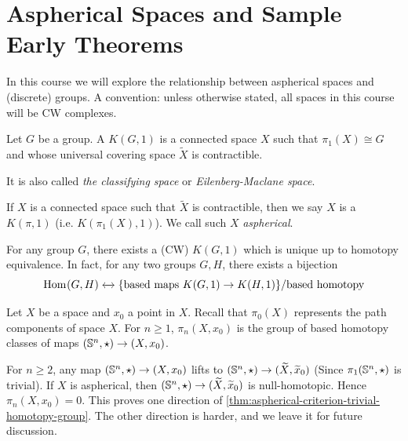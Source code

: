 \section{Aspherical Spaces and Sample Early Theorems}
\label{sec:L01-W01D1}

In this course we will explore the relationship between aspherical spaces and (discrete) groups. A convention: unless otherwise stated, all spaces in this course will be CW complexes.

\begin{definition}[\(K(G,1)\)]
    \label{def:KG1}
    Let \(G\) be a group.
    A \emph{\( K(G,1) \) }is a connected space \(X\) such that \(\pi_1(X) \cong G\)  and  whose universal covering space \(\tilde X\) is contractible.

    It is also called \emph{the classifying space} or \emph{Eilenberg-Maclane space}.
\end{definition}

\begin{definition}
    \label{def:aspherical-space}
    If \(X\)  is a connected space such that \(\tilde X\) is contractible, then we say \(X\) is a \emph{\(K(\pi,1)\)} (i.e. \(K(\pi_1(X),1)\)). We call such \(X\) \emph{aspherical}.
\end{definition}



\begin{theorem}
    \label{thm:existence-uniqueness-of-KG1}
    For any group \(G\), there exists a (CW) \(K(G,1)\) which is unique up to homotopy equivalence.
    In fact, for any two groups \(G,H\), there exists a bijection 
    \[
        \operatorname{Hom}_{{}}({G}, {H}) \xleftrightarrow{} \{ \text{based maps } K(G,1) \to K(H,1) \} / \text{based homotopy}
    \]
\end{theorem}


Let \(X\) be a space and \(x_0\) a point in \(X\).
Recall that \(\pi_0(X)\) represents the path components of space \(X\). For \(n\geq 1\), \(\pi_n(X,x_0)\) is the group of based homotopy classes of maps \((\mathbb{S}^n , \star) \to (X,x_0)\).

For \(n\geq 2\), any map \((\mathbb{S}^n , \star) \to (X,x_0)\) lifts to \((\mathbb{S}^n , \star) \to (\widetilde X, \widetilde x_0)\) (Since \(\pi_1(\mathbb{S}^n ,\star)\) is trivial). If \(X\) is aspherical, then \((\mathbb{S}^n , \star) \to (\widetilde X, \widetilde x_0)\) is null-homotopic. Hence \(\pi_n(X,x_0) =0\). This proves one direction of \cref{thm:aspherical-criterion-trivial-homotopy-group}. The other direction is harder, and we leave it for future discussion.                   

